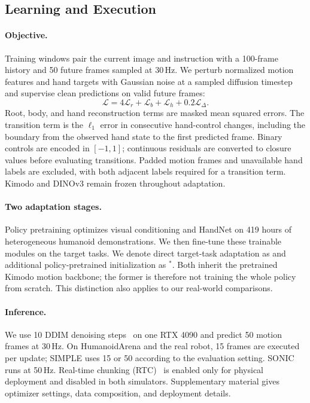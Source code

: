 \subsection{Learning and Execution}
\label{sec:learning}
\paragraph{Objective.}
Training windows pair the current image and instruction with a 100-frame history and 50 future frames sampled at 30\,Hz. We perturb normalized motion features and hand targets with Gaussian noise at a sampled diffusion timestep and supervise clean predictions on valid future frames:
\begin{equation}
\mathcal{L}=4\mathcal{L}_r+\mathcal{L}_b+
\mathcal{L}_h+0.2\mathcal{L}_{\Delta}.
\label{eq:objective}
\end{equation}
Root, body, and hand reconstruction terms are masked mean squared errors. The transition term is the $\ell_1$ error in consecutive hand-control changes, including the boundary from the observed hand state to the first predicted frame. Binary controls are encoded in $[-1,1]$; continuous residuals are converted to closure values before evaluating transitions. Padded motion frames and unavailable hand labels are excluded, with both adjacent labels required for a transition term. Kimodo and DINOv3 remain frozen throughout adaptation.

\paragraph{Two adaptation stages.}
Policy pretraining optimizes visual conditioning and HandNet on 419 hours of heterogeneous humanoid demonstrations. We then fine-tune these trainable modules on the target tasks. We denote direct target-task adaptation as \ours{} and additional policy-pretrained initialization as \ours$^{*}$. Both inherit the pretrained Kimodo motion backbone; the former is therefore not training the whole policy from scratch. This distinction also applies to our real-world comparisons.

\paragraph{Inference.}
We use 10 DDIM denoising steps~\cite{song2022denoisingdiffusionimplicitmodels} on one RTX 4090 and predict 50 motion frames at 30\,Hz. On HumanoidArena and the real robot, 15 frames are executed per update; SIMPLE uses 15 or 50 according to the evaluation setting. SONIC runs at 50\,Hz. Real-time chunking (RTC)~\cite{rtc} is enabled only for physical deployment and disabled in both simulators. Supplementary material gives optimizer settings, data composition, and deployment details.

